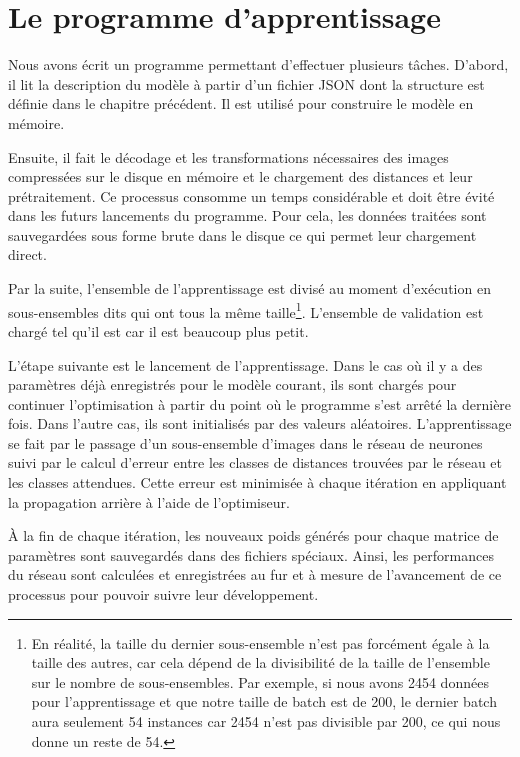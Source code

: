 \section{Le programme d'apprentissage}

Nous avons écrit un programme permettant d'effectuer plusieurs tâches.
D'abord, il lit la description du modèle à partir d'un fichier JSON dont
la structure est définie dans le chapitre précédent. Il est utilisé pour
construire le modèle en mémoire.

Ensuite, il fait le décodage et les transformations nécessaires des images
compressées sur le disque en mémoire et le chargement des distances et leur prétraitement.
Ce processus consomme un temps considérable et doit être évité dans les futurs lancements
du programme. Pour cela, les données traitées sont sauvegardées
sous forme brute dans le disque ce qui permet leur chargement direct.

Par la suite, l'ensemble de l'apprentissage est divisé au moment d'exécution en
sous-ensembles dits  qui ont tous la même taille\footnote{
En réalité, la taille du dernier sous-ensemble n'est pas forcément égale à la
taille des autres, car cela dépend de la divisibilité de la taille de l'ensemble
sur le nombre de sous-ensembles. Par exemple, si nous avons 2454 données pour
l'apprentissage et que notre taille de batch est de 200, le dernier batch aura seulement
54 instances car 2454 n'est pas divisible par 200, ce qui nous donne un reste de 54.}.
L'ensemble de validation est chargé tel qu'il est car il est beaucoup plus petit.

L'étape suivante est le lancement de l'apprentissage. Dans le cas où il y a des
paramètres déjà enregistrés pour le modèle courant, ils sont chargés
pour continuer l'optimisation à partir du point où le programme s'est arrêté la
dernière fois. Dans l'autre cas, ils sont initialisés par des valeurs aléatoires.
L'apprentissage se fait par le passage d'un sous-ensemble d'images dans le réseau
de neurones suivi par le calcul d'erreur entre les classes de distances trouvées
par le réseau et les classes attendues. Cette erreur est minimisée à chaque
itération en appliquant la propagation arrière à l'aide de l'optimiseur.

\`A la fin de chaque itération, les nouveaux poids générés pour chaque matrice de paramètres
sont sauvegardés dans des fichiers spéciaux. Ainsi, les performances du réseau sont calculées
et enregistrées au fur et à mesure de l'avancement de ce processus pour pouvoir
suivre leur développement.

